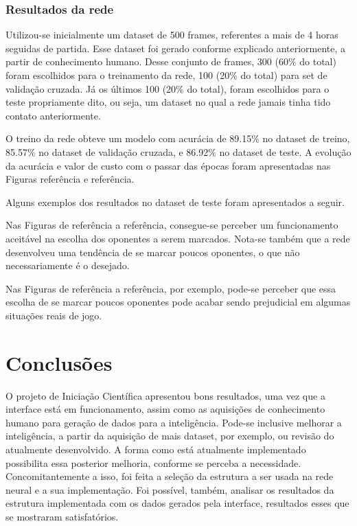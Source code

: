 \documentclass[a4paper,12pt]{article}
\begin{document}
\subsubsection{Resultados da rede}

Utilizou-se inicialmente um dataset de 500 frames, referentes a mais de 4 horas seguidas de partida. Esse dataset foi gerado conforme explicado anteriormente, a partir de conhecimento humano. Desse conjunto de frames, 300 (60\% do total) foram escolhidos para o treinamento da rede, 100 (20\% do total) para set de validação cruzada. Já os últimos 100 (20\% do total), foram escolhidos para o teste propriamente dito, ou seja, um dataset no qual a rede jamais tinha tido contato anteriormente.

O treino da rede obteve um modelo com acurácia de 89.15\% no dataset de treino, 85.57\% no dataset de validação cruzada, e 86.92\% no dataset de teste. A evolução da acurácia e valor de custo com o passar das épocas foram apresentadas nas Figuras referência e referência.

Alguns exemplos dos resultados no dataset de teste foram apresentados a seguir.

Nas Figuras de referência a referência, consegue-se perceber um funcionamento aceitável na escolha dos oponentes a serem marcados. Nota-se também que a rede desenvolveu uma tendência de se marcar poucos oponentes, o que não necessariamente é o desejado.

Nas Figuras de referência a referência, por exemplo, pode-se perceber que essa escolha de se marcar poucos oponentes pode acabar sendo prejudicial em algumas situações reais de jogo.

\section{Conclusões}

O projeto de Iniciação Científica apresentou bons resultados, uma vez que a interface está em funcionamento, assim como as aquisições de conhecimento humano para geração de dados para a inteligência. Pode-se inclusive melhorar a inteligência, a partir da aquisição de mais dataset, por exemplo, ou revisão do atualmente desenvolvido. A forma como está atualmente implementado possibilita essa posterior melhoria, conforme se perceba a necessidade. Concomitantemente a isso, foi feita a seleção da estrutura a ser usada na rede neural e a sua implementação. Foi possível, também, analisar os resultados da estrutura implementada com os dados gerados pela interface, resultados esses que se mostraram satisfatórios.
\end{document}

